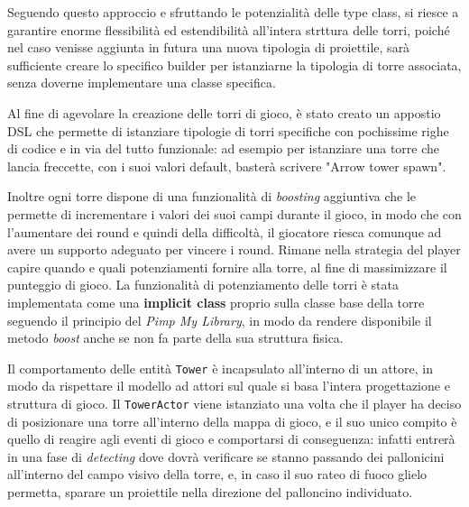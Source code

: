 

Seguendo questo approccio e sfruttando le potenzialità delle type class, si riesce a garantire enorme flessibilità ed
estendibilità all'intera strttura delle torri, poiché nel caso venisse aggiunta in futura una nuova tipologia di
proiettile, sarà sufficiente creare lo specifico builder per istanziarne la tipologia di torre associata, senza
doverne implementare una classe specifica.

Al fine di agevolare la creazione delle torri di gioco, è stato creato un appostio DSL che permette di istanziare
tipologie di torri specifiche con pochissime righe di codice e in via del tutto funzionale: ad esempio per istanziare
una torre che lancia freccette, con i suoi valori default, basterà scrivere "Arrow tower spawn".



Inoltre ogni torre dispone di una funzionalità di \textit{boosting} aggiuntiva che le permette di incrementare i valori
dei suoi campi durante il gioco, in modo che con l'aumentare dei round e quindi della difficoltà, il giocatore riesca
comunque ad avere un supporto adeguato per vincere i round. Rimane nella strategia del player capire quando e quali
potenziamenti fornire alla torre, al fine di massimizzare il punteggio di gioco. La funzionalità di potenziamento
delle torri è stata implementata come una \textbf{implicit class} proprio sulla classe base della torre seguendo il
principio del \textit{Pimp My Library}, in modo da rendere disponibile il metodo \textit{boost} anche se non fa
parte della sua struttura fisica.

Il comportamento delle entità \texttt{Tower} è incapsulato all'interno di un attore, in modo da rispettare il modello
ad attori sul quale si basa l'intera progettazione e struttura di gioco. Il \texttt{TowerActor} viene istanziato una
volta che il player ha deciso di posizionare una torre all'interno della mappa di gioco, e il suo unico compito è
quello di reagire agli eventi di gioco e comportarsi di conseguenza: infatti entrerà in una fase di
\textit{detecting} dove dovrà verificare se stanno passando dei pallonicini all'interno del campo visivo della torre,
e, in caso il suo rateo di fuoco glielo permetta, sparare un proiettile nella direzione del palloncino individuato.

